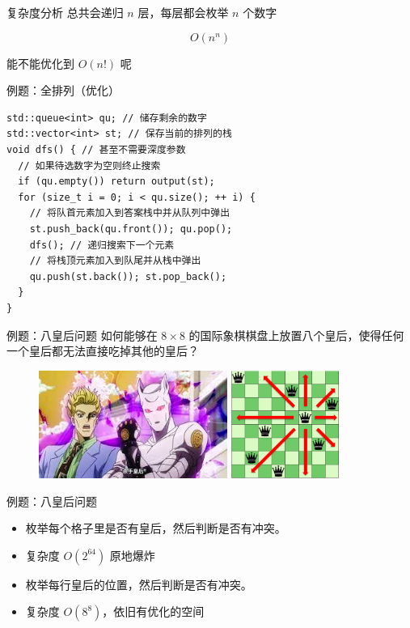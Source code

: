\documentclass[12pt,aspectratio=169]{beamer}
\begin{document}
\begin{frame}[fragile]{复杂度分析}
  总共会递归 $n$ 层，每层都会枚举 $n$ 个数字\pause

  $$O(n^n)$$\pause

  能不能优化到 $O(n!)$ 呢
\end{frame}

\begin{frame}[fragile]{例题：全排列（优化）}
  \begin{verbatim}
std::queue<int> qu; // 储存剩余的数字
std::vector<int> st; // 保存当前的排列的栈
void dfs() { // 甚至不需要深度参数
  // 如果待选数字为空则终止搜索
  if (qu.empty()) return output(st);
  for (size_t i = 0; i < qu.size(); ++ i) {
    // 将队首元素加入到答案栈中并从队列中弹出
    st.push_back(qu.front()); qu.pop();
    dfs(); // 递归搜索下一个元素
    // 将栈顶元素加入到队尾并从栈中弹出
    qu.push(st.back()); st.pop_back();
  }
}
  \end{verbatim}
\end{frame}

\begin{frame}[fragile]{例题：八皇后问题}
  如何能够在 $8 \times 8$ 的国际象棋棋盘上放置八个皇后，使得任何一个皇后都无法直接吃掉其他的皇后？

  \begin{figure}
    \includegraphics[height=100pt]{killer_queen.jpeg}
    \includegraphics[height=100pt]{queen.png}
  \end{figure}
\end{frame}

\begin{frame}[fragile]{例题：八皇后问题}
  \begin{itemize}
    \item 枚举每个格子里是否有皇后，然后判断是否有冲突。\pause
    \item 复杂度 $O(2^{64})$ 原地爆炸\pause
    \item 枚举每行皇后的位置，然后判断是否有冲突。\pause
    \item 复杂度 $O(8^8)$，依旧有优化的空间
  \end{itemize}
\end{frame}
\end{document}
